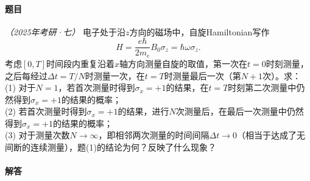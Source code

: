 \begin{tcolorbox}[breakable, title={\textbf{趣题：量子Zeno效应}}]
    \paragraph{题目} \textit{（2025年考研·七）}
    电子处于沿$z$方向的磁场中，自旋Hamiltonian写作
    \begin{equation}
        H = \frac{e\hbar}{2m_e} B_0 σ_z = \hbar ω σ_z.
    \end{equation}
    考虑$[0,T]$时间段内重复沿着$x$轴方向测量自旋的取值，第一次在$t=0$时刻测量，之后每经过$Δt=T/N$时测量一次，在$t=T$时测量最后一次（第$N+1$次）。求：\\
    (1) 对于$N=1$，若首次测量时得到$σ_x=+1$的结果，在$t=T$时刻第二次测量中仍然得到$σ_x=+1$的结果的概率；\\
    (2) 若首次测量时得到$σ_x=+1$的结果，进行$N$次测量后，在最后一次测量中仍然得到$σ_x=+1$的结果的概率；\\
    (3) 对于测量次数$N→∞$，即相邻两次测量的时间间隔$Δt→0$（相当于达成了无间断的连续测量），题(1)的结论为何？反映了什么现象？
    \vspace{1em}

    \paragraph{解答}


\end{tcolorbox}
